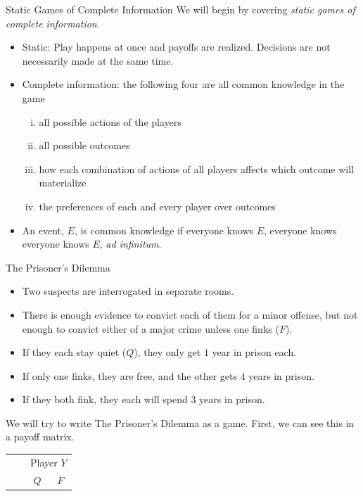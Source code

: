 \documentclass[10pt]{extarticle}
\begin{document}
  \begin{problem}{Static Games of Complete Information}
    We will begin by covering \textit{static games of complete information}.
    \begin{itemize}
      \item Static: Play happens at once and payoffs are realized. Decisions are not necessarily made at the same time.
      \item Complete information: the following four are all common knowledge in the game
        \begin{enumerate}[(i)]
          \item all possible actions of the players
          \item all possible outcomes
          \item how each combination of actions of all players affects which outcome will materialize
          \item the preferences of each and every player over outcomes
        \end{enumerate}
      \item An event, $E$, is common knowledge if everyone knows $E$, everyone knows everyone knows $E$, \textit{ad infinitum}.
    \end{itemize}
    \begin{problem}{The Prisoner's Dilemma}
      \begin{itemize}
        \item Two suspects are interrogated in separate rooms.
        \item There is enough evidence to convict each of them for a minor offense, but not enough to convict either of a major crime unless one finks ($F$).
        \item If they each stay quiet ($Q$), they only get $1$ year in prison each.
        \item If only one finks, they are free, and the other gets $4$ years in prison.
        \item If they both fink, they each will spend $3$ years in prison.
      \end{itemize}
      We will try to write The Prisoner's Dilemma as a game. First, we can see this in a payoff matrix.
      \begin{center}
        \renewcommand{\arraystretch}{1.25}
        \begin{tabular}{cc|c|c|}
          & \multicolumn{1}{c}{} & \multicolumn{2}{c}{Player $Y$}\\
          & \multicolumn{1}{c}{} & \multicolumn{1}{c}{$Q$}  & \multicolumn{1}{c}{$F$} \\\cline{3-4}

\end{tabular}
\end{center}
\end{problem}
\end{problem}
\end{document}
